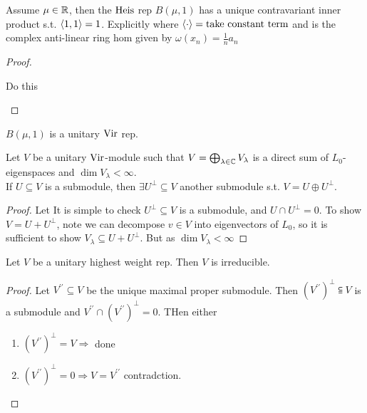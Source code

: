 \documentclass{article}
\begin{document}
\begin{prop}
Assume $\mu \in \mathbb{R}$, then the $\operatorname{Heis}$ rep $B(\mu,1)$ has a unique contravariant inner product s.t. $\left\langle 1,1 \right\rangle=1$. Explicitly 
where $\left\langle \cdot \right\rangle= \text{take constant term}$ and 
is the complex anti-linear ring hom given by $\omega(x_n) = \frac{1}{n}a_n $
\end{prop}
\begin{proof}
\begin{ex}
Do this
\end{ex}
\end{proof}

\begin{corollary}
$B(\mu,1)$ is a unitary $\operatorname{Vir}$ rep. 
\end{corollary}

\begin{lemma}
Let $V$ be a unitary $\operatorname{Vir}$-module such that $V = \bigoplus_{\lambda \in \mathbb{C}}V_\lambda$ is a direct sum of $L_0$-eigenspaces and $\dim V_\lambda  < \infty$. \\
If $U \subseteq V$ is a submodule, then $\exists U^\perp \subseteq V$ another submodule s.t. $V = U \oplus U^\perp$. 
\end{lemma}
\begin{proof}
Let 
It is simple to check $U^\perp \subseteq V$ is a submodule, and $U \cap U^\perp = 0$. To show $V = U + U^\perp$, note we can decompose $v \in V$ into eigenvectors of $L_0$, so it is sufficient to show $V_\lambda \subseteq U + U^\perp$. But 
as $\dim V_\lambda < \infty$
\end{proof}

\begin{lemma}
Let $V$ be a unitary highest weight rep. Then $V$ is irreducible.
\end{lemma}
\begin{proof}
Let $V^{\prime\prime} \subseteq V$ be the unique maximal proper submodule. Then $(V^{\prime\prime})^\perp \subseteqq V$ is a submodule and $V^{\prime\prime} \cap (V^{\prime\prime})^\perp = 0$. THen either 
\begin{enumerate}
    \item $(V^{\prime\prime})^\perp = V \Rightarrow$ done 
    \item $(V^{\prime\prime})^\perp = 0 \Rightarrow V = V^{\prime\prime}$ contradction. 
\end{enumerate}
\end{proof}
\end{document}
